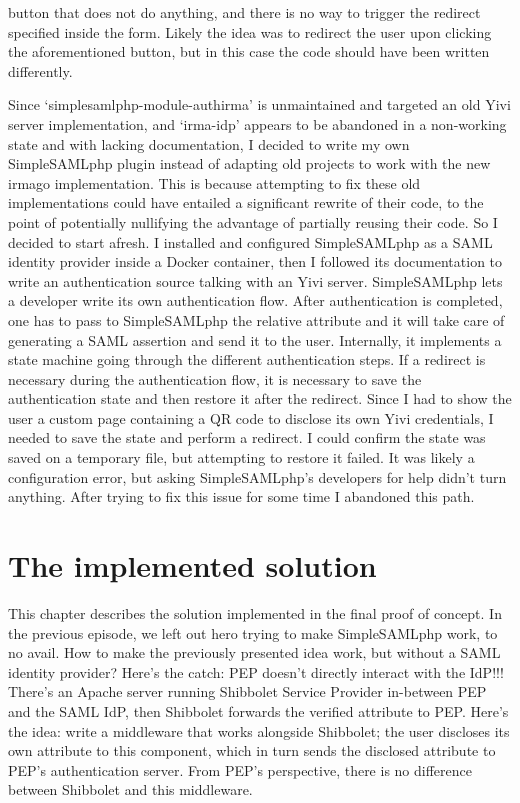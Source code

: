 \documentclass{report}
\begin{document}
button that does not do anything, and there is no way to trigger the redirect specified inside the form. Likely the idea was to
redirect the user upon clicking the aforementioned button, but in this case the code should have been written differently. 
\par
Since \enquote*{simplesamlphp-module-authirma} is unmaintained and targeted an old Yivi server implementation, and \enquote*{irma-idp} appears to be abandoned in a non-working
state and with lacking documentation, I decided to write my own SimpleSAMLphp plugin instead of adapting old projects to work with the new irmago implementation. This is because
attempting to fix these old implementations could have entailed a significant rewrite of their code, to the point of potentially nullifying the advantage of partially reusing their
code. So I decided to start afresh. I installed and configured SimpleSAMLphp \cite{simplesamlphp-docs} as a SAML identity provider \cite{sstc-saml-core-errata-2.0-wd-07} inside a
Docker container, then I followed its documentation to write an authentication source talking with an Yivi server. SimpleSAMLphp lets a developer write its own authentication
flow. After authentication is completed, one has to pass to SimpleSAMLphp the relative attribute and it will take care of generating a SAML assertion and send it to the user.
Internally, it implements a state machine going through the different authentication steps. If a redirect is necessary during the authentication flow, it is necessary to save the
authentication state and then restore it after the redirect.  Since I had to show the user a custom page containing a QR code to disclose its own Yivi credentials, I needed to save
the state and perform a redirect. I could confirm the state was saved on a temporary file, but attempting to restore it failed. It was likely a configuration error, but asking
SimpleSAMLphp's developers for help didn't turn anything. After trying to fix this issue for some time I abandoned this path.


\chapter{The implemented solution}
This chapter describes the solution implemented in the final proof of concept. In the previous episode, we left out hero trying to make SimpleSAMLphp work, to no avail. How to make
the previously presented idea work, but without a SAML identity provider? Here's the catch: PEP doesn't directly interact with the IdP!!! There's an Apache server running Shibbolet
Service Provider 
in-between PEP and the SAML IdP, then Shibbolet forwards the verified attribute to PEP. Here's the idea: write a middleware that works alongside Shibbolet; the user discloses its
own attribute to this component, which in turn sends the disclosed attribute to PEP's authentication server. From PEP's perspective, there is no difference between Shibbolet and
this middleware.  
\end{document}
